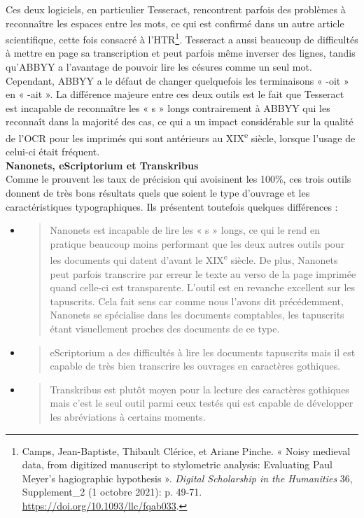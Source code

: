 \documentclass[a4paper,12pt,twoside]{book}
\begin{document}
Ces deux logiciels, en particulier Tesseract, rencontrent parfois des
problèmes à reconnaître les espaces entre les mots, ce qui est confirmé
dans un autre article scientifique, cette fois consacré à
l'HTR\footnote{Camps, Jean-Baptiste, Thibault Clérice, et Ariane Pinche.
	« Noisy medieval data, from digitized manuscript to stylometric
	analysis: Evaluating Paul Meyer's hagiographic hypothesis ».
	\emph{Digital Scholarship in the Humanities} 36, Supplement\_2 (1
	octobre 2021): p. 49‑71.
	\url{https://doi.org/10.1093/llc/fqab033}.}.
Tesseract a aussi beaucoup de difficultés à mettre en page sa
transcription et peut parfois même inverser des lignes, tandis qu'ABBYY
a l'avantage de pouvoir lire les césures comme un seul mot. Cependant,
ABBYY a le défaut de changer quelquefois les terminaisons « -oit » en «
-ait ». La différence majeure entre ces deux outils est le fait que
Tesseract est incapable de reconnaître les « s » longs contrairement à
ABBYY qui les reconnaît dans la majorité des cas, ce qui a un impact
considérable sur la qualité de l'OCR pour les imprimés qui sont
antérieurs au XIX\textsuperscript{e} siècle, lorsque l'usage de celui-ci
était fréquent. \\

\textbf{Nanonets, eScriptorium et Transkribus} \\

Comme le prouvent les taux de précision qui avoisinent les 100\%, ces
trois outils donnent de très bons résultats quels que soient le type
d'ouvrage et les caractéristiques typographiques. Ils présentent
toutefois quelques différences : \\

\begin{itemize}
	\item
	\begin{quote}
		Nanonets est incapable de lire les « s » longs, ce qui le rend en
		pratique beaucoup moins performant que les deux autres outils pour les
		documents qui datent d'avant le XIX\textsuperscript{e} siècle. De
		plus, Nanonets peut parfois transcrire par erreur le texte au verso de
		la page imprimée quand celle-ci est transparente. L'outil est en
		revanche excellent sur les tapuscrits. Cela fait sens car comme nous l'avons dit précédemment, Nanonets se spécialise dans les documents comptables, les tapuscrits étant visuellement proches des documents de ce type.
	\end{quote}
	\item
	\begin{quote}
		eScriptorium a des difficultés à lire les documents tapuscrits mais il
		est capable de très bien transcrire les ouvrages en caractères
		gothiques.
	\end{quote}
	\item
	\begin{quote}
		Transkribus est plutôt moyen pour la lecture des caractères gothiques
		mais c'est le seul outil parmi ceux testés qui est capable de
		développer les abréviations à certains moments. \\
	\end{quote}
\end{itemize}
\end{document}
